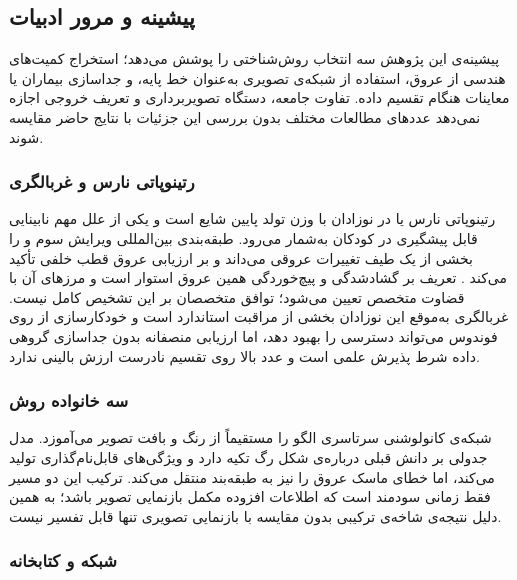 \subsection{پیشینه و مرور ادبیات}

پیشینه‌ی این پژوهش سه انتخاب روش‌شناختی را پوشش می‌دهد؛ استخراج کمیت‌های هندسی از عروق، استفاده از شبکه‌ی تصویری به‌عنوان خط پایه، و جداسازی بیماران یا معاینات هنگام تقسیم داده. تفاوت جامعه، دستگاه تصویربرداری و تعریف خروجی اجازه نمی‌دهد عددهای مطالعات مختلف بدون بررسی این جزئیات با نتایج حاضر مقایسه شوند.

\subsubsection{رتینوپاتی نارس و غربالگری }

رتینوپاتی نارس یا  در نوزادان با وزن تولد پایین شایع است و یکی از علل مهم نابینایی قابل پیشگیری در کودکان به‌شمار می‌رود. طبقه‌بندی بین‌المللی ویرایش سوم  و  را بخشی از یک طیف تغییرات عروقی می‌داند و بر ارزیابی عروق قطب خلفی تأکید می‌کند \cite{chiang2021}. تعریف  بر گشادشدگی و پیچ‌خوردگی همین عروق استوار است و مرزهای آن با قضاوت متخصص تعیین می‌شود؛ توافق متخصصان بر این تشخیص کامل نیست. غربالگری به‌موقع این نوزادان بخشی از مراقبت استاندارد است \cite{fierson2018} و خودکارسازی از روی فوندوس می‌تواند دسترسی را بهبود دهد، اما ارزیابی منصفانه بدون جداسازی گروهی داده شرط پذیرش علمی است و عدد بالا روی تقسیم نادرست ارزش بالینی ندارد.

\subsubsection{سه خانواده روش}

شبکه‌ی کانولوشنی سرتاسری الگو را مستقیماً از رنگ و بافت تصویر می‌آموزد. مدل جدولی بر دانش قبلی درباره‌ی شکل رگ تکیه دارد و ویژگی‌های قابل‌نام‌گذاری تولید می‌کند، اما خطای ماسک عروق را نیز به طبقه‌بند منتقل می‌کند. ترکیب این دو مسیر فقط زمانی سودمند است که اطلاعات افزوده مکمل بازنمایی تصویر باشد؛ به همین دلیل نتیجه‌ی شاخه‌ی ترکیبی بدون مقایسه با بازنمایی تصویری تنها قابل تفسیر نیست.

\subsubsection{شبکه  و کتابخانه }


